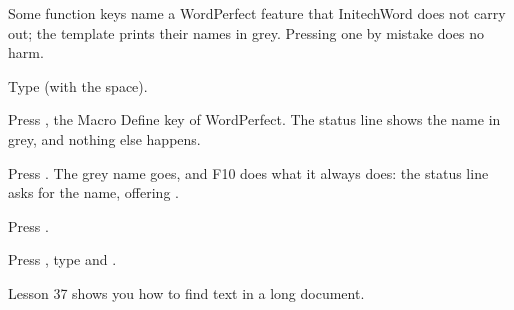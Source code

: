 Some function keys name a WordPerfect feature that InitechWord does not
carry out; the template prints their names in grey.  Pressing one by mistake
does no harm.
\begin{WPSteps}
\item Type  (with the space).
\item Press , the Macro Define key of WordPerfect.  The
status line shows the name in grey, and nothing else happens.
\end{WPSteps}
\begin{WPSteps}[resume]
\item Press .  The grey name goes, and F10 does what it
always does: the status line asks for the name, offering .
\item Press .
\item Press , type  and .
\end{WPSteps}
\EndReplay
Lesson 37 shows you how to find text in a long document.
